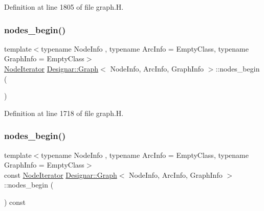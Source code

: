 Definition at line 1805 of file graph.\+H.

\mbox{\label{class_designar_1_1_graph_a4f492f9b89d1d647e53171d7bb4d4acd}} 
\subsubsection{\texorpdfstring{nodes\+\_\+begin()}{nodes\_begin()}\hspace{0.1cm}{\footnotesize\ttfamily [1/2]}}
{\footnotesize\ttfamily template$<$typename Node\+Info , typename Arc\+Info  = Empty\+Class, typename Graph\+Info  = Empty\+Class$>$ \\
\hyperlink{class_designar_1_1_graph_1_1_node_iterator}{Node\+Iterator} \hyperlink{class_designar_1_1_graph}{Designar\+::\+Graph}$<$ Node\+Info, Arc\+Info, Graph\+Info $>$\+::nodes\+\_\+begin (\begin{DoxyParamCaption}{ }\end{DoxyParamCaption})\hspace{0.3cm}{\ttfamily [inline]}}



Definition at line 1718 of file graph.\+H.

\mbox{\label{class_designar_1_1_graph_acd4d942eba98e1eb138b9566f1d9bb75}} 
\subsubsection{\texorpdfstring{nodes\+\_\+begin()}{nodes\_begin()}\hspace{0.1cm}{\footnotesize\ttfamily [2/2]}}
{\footnotesize\ttfamily template$<$typename Node\+Info , typename Arc\+Info  = Empty\+Class, typename Graph\+Info  = Empty\+Class$>$ \\
const \hyperlink{class_designar_1_1_graph_1_1_node_iterator}{Node\+Iterator} \hyperlink{class_designar_1_1_graph}{Designar\+::\+Graph}$<$ Node\+Info, Arc\+Info, Graph\+Info $>$\+::nodes\+\_\+begin (\begin{DoxyParamCaption}{ }\end{DoxyParamCaption}) const\hspace{0.3cm}{\ttfamily [inline]}}



